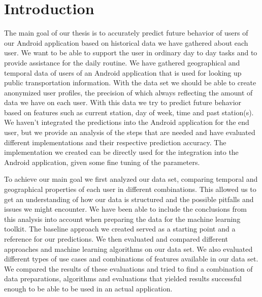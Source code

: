 \newpage
\section{Introduction}
The main goal of our thesis is to accurately predict future behavior of users of our Android application based on historical data we have gathered about each user. We want to be able to support the user in ordinary day to day tasks and to provide assistance for the daily routine. We have gathered geographical and temporal data of users of an Android application that is used for looking up public transportation information. With the data set we should be able to create anonymized user profiles, the precision of which always reflecting the amount of data we have on each user. With this data we try to predict future behavior based on features such as current station, day of week, time and past station(s). We haven't integrated the predictions into the Android application for the end user, but we provide an analysis of the steps that are needed and have evaluated different implementations and their respective prediction accuracy. The implementation we created can be directly used for the integration into the Android application, given some fine tuning of the parameters.

To achieve our main goal we first analyzed our data set, comparing temporal and geographical properties of each user in different combinations. This allowed us to get an understanding of how our data is structured and the possible pitfalls and issues we might encounter. We have been able to include the conclusions from this analysis into account when preparing the data for the machine learning toolkit. The baseline approach we created served as a starting point and a reference for our predictions. We then evaluated and compared different approaches and machine learning algorithms on our data set. We also evaluated different types of use cases and combinations of features available in our data set. We compared the results of these evaluations and tried to find a combination of data preparations, algorithms and evaluations that yielded results successful enough to be able to be used in an actual application. 


